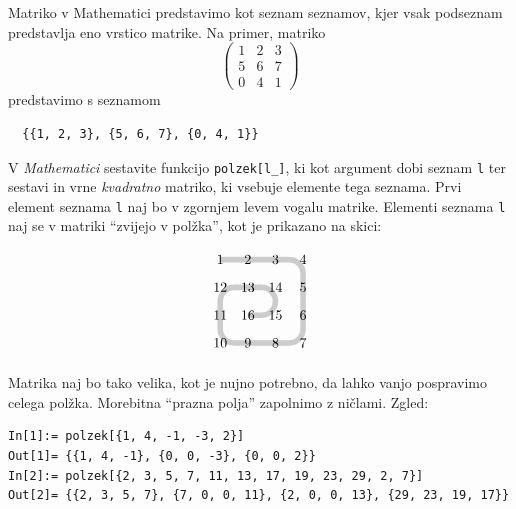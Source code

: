 \documentclass[arhiv]{../izpit}
\begin{document}


Matriko v Mathematici predstavimo kot seznam seznamov, kjer vsak podseznam predstavlja eno vrstico matrike. Na primer, matriko
$$
\begin{pmatrix}
1 & 2 & 3 \\
5 & 6 & 7 \\
0 & 4 & 1
\end{pmatrix}
$$
predstavimo s seznamom
\begin{verbatim}
  {{1, 2, 3}, {5, 6, 7}, {0, 4, 1}}
\end{verbatim}
%
\podnaloga[20 točk]
V \emph{Mathematici} sestavite funkcijo \texttt{polzek[l\_]}, ki kot argument dobi seznam \texttt{l} ter sestavi in vrne \emph{kvadratno} matriko, ki vsebuje elemente tega seznama. Prvi element seznama \texttt{l} naj bo v zgornjem levem vogalu matrike. Elementi seznama \texttt{l} naj se v matriki ``zvijejo v polžka'', kot je prikazano na skici:

$$
\begin{tikzpicture}[scale=0.7]
\def\stevilke{{7,8,9,10,6,1,2,11,5,4,3,-1}}
\draw [rounded corners=10pt,color=gray!40, line width=4pt]
(0, 0) -- (1, 0) -- (2, 0) -- (3, 0) -- (3, -1) -- (3, -2) -- (3, -3) -- (2, -3) -- (1, -3) -- (0, -3) --
(0, -2) -- (0, -1) -- (1, -1) -- (2, -1) -- (2, -2) -- (1, -2);
\node at (0, 0) {1};
\node at (1, 0) {2};
\node at (2, 0) {3};
\node at (3, 0) {4};
\node at (3, -1) {5};
\node at (3, -2) {6};
\node at (3, -3) {7};
\node at (2, -3) {8};
\node at (1, -3) {9};
\node at (0, -3) {10};
\node at (0, -2) {11};
\node at (0, -1) {12};
\node at (1, -1) {13};
\node at (2, -1) {14};
\node at (2, -2) {15};
\node at (1, -2) {16};
\end{tikzpicture}
$$

\noindent Matrika naj bo tako velika, kot je nujno potrebno, da lahko vanjo pospravimo celega polžka. Morebitna ``prazna polja'' zapolnimo z ničlami.  Zgled:
%
\begin{verbatim}
In[1]:= polzek[{1, 4, -1, -3, 2}]
Out[1]= {{1, 4, -1}, {0, 0, -3}, {0, 0, 2}}
In[2]:= polzek[{2, 3, 5, 7, 11, 13, 17, 19, 23, 29, 2, 7}]
Out[2]= {{2, 3, 5, 7}, {7, 0, 0, 11}, {2, 0, 0, 13}, {29, 23, 19, 17}}
\end{verbatim}
\end{document}
